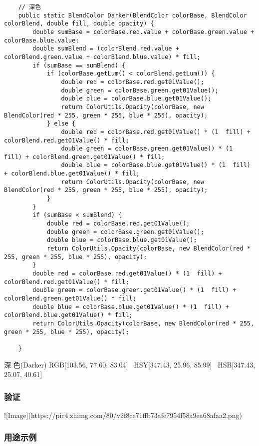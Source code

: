 \begin{lstlisting}
	// 深色
	public static BlendColor Darker(BlendColor colorBase, BlendColor colorBlend, double fill, double opacity) {
		double sumBase = colorBase.red.value + colorBase.green.value + colorBase.blue.value;
		double sumBlend = (colorBlend.red.value + colorBlend.green.value + colorBlend.blue.value) * fill;
		if (sumBase == sumBlend) {
			if (colorBase.getLum() < colorBlend.getLum()) {
				double red = colorBase.red.get01Value();
				double green = colorBase.green.get01Value();
				double blue = colorBase.blue.get01Value();
				return ColorUtils.Opacity(colorBase, new BlendColor(red * 255, green * 255, blue * 255), opacity);
			} else {
				double red = colorBase.red.get01Value() * (1  fill) + colorBlend.red.get01Value() * fill;
				double green = colorBase.green.get01Value() * (1  fill) + colorBlend.green.get01Value() * fill;
				double blue = colorBase.blue.get01Value() * (1  fill) + colorBlend.blue.get01Value() * fill;
				return ColorUtils.Opacity(colorBase, new BlendColor(red * 255, green * 255, blue * 255), opacity);
			}
		}
		if (sumBase < sumBlend) {
			double red = colorBase.red.get01Value();
			double green = colorBase.green.get01Value();
			double blue = colorBase.blue.get01Value();
			return ColorUtils.Opacity(colorBase, new BlendColor(red * 255, green * 255, blue * 255), opacity);
		}
		double red = colorBase.red.get01Value() * (1  fill) + colorBlend.red.get01Value() * fill;
		double green = colorBase.green.get01Value() * (1  fill) + colorBlend.green.get01Value() * fill;
		double blue = colorBase.blue.get01Value() * (1  fill) + colorBlend.blue.get01Value() * fill;
		return ColorUtils.Opacity(colorBase, new BlendColor(red * 255, green * 255, blue * 255), opacity);
		
	}
\end{lstlisting}



深    色(Darker)        RGB[103.56,  77.60,  83.04]~ HSY[347.43,  25.96,  85.99]~ HSB[347.43,  25.07,  40.61]


\subsubsection{ 验证}

![Image](https://pic4.zhimg.com/80/v2f8ce71ffb73afe7954f58a9ea68afaa2.png)

\subsubsection{ 用途示例}

